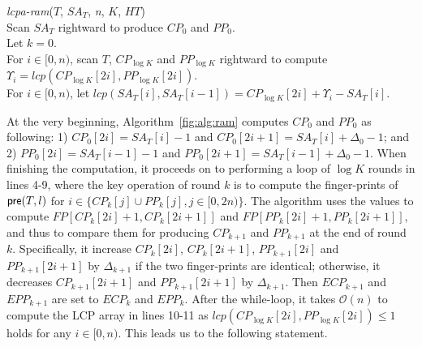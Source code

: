 \documentclass{llncs}
\begin{document}
\begin{algorithm}[hbtp!]
\caption{Compute $K$-Order $LCPA_T$ in RAM}
\label{fig:alg:ram}
{\em lcpa-ram}($T$, $SA_T$, {\em n}, $K$, $HT$){\\
\SetAlgoNoLine
Scan $SA_T$ rightward to produce $CP_0$ and $PP_0$. \\
Let $k = 0$. \\
\While{$k < \log K$}{
\Indentp{-1em}
Radix-sort $CP_k$ and $PP_k$ to produce $ICP_k$ and $IPP_k$. \\
For $i\in [0,n)$, scan $T$ rightward to compute the finger-print of ${\sf pre}(T,i)$ and let $FP[0,i]=HT[i]$ if $i\in \{ICP_k[j] \cup IPP_k[j], j\in[0,2n)\}$. \\
For $i\in [0,n)$, scan $CP_k$ and $PP_k$ rightward to compute and compare $FP[CP_k[2i]+1,CP_k[2i+1]]$ and $FP[PP_k[2i]+1,PP_k[2i+1]]$ for generating $CP_{k+1}$ and $PP_{k+1}$. \\
Let $k = k +1$ and clear $HT$. \\
}
For $i\in [0,n)$, scan $T$, $CP_{\log K}$ and $PP_{\log K}$ rightward to compute $\Upsilon_i = lcp(CP_{\log K}[2i],PP_{\log K}[2i])$. \\
For $i\in [0,n)$, let $lcp(SA_T[i],SA_T[i-1])=CP_{\log K}[2i] +\Upsilon_i-SA_T[i]$. \\
}
\end{algorithm}

At the very beginning, Algorithm~\ref{fig:alg:ram} computes $CP_0$ and $PP_0$ as following: 1) $CP_0[2i]=SA_T[i]-1$ and $CP_0[2i+1]=SA_T[i]+ \Delta_0 - 1$; and 2) $PP_0[2i]=SA_T[i-1]-1$ and $PP_0[2i+1]=SA_T[i-1]+ \Delta_0 - 1$. When finishing the computation, it proceeds on to performing a loop of $\log K$ rounds in lines 4-9, where the key operation of round $k$ is to compute the finger-prints of ${\sf pre}(T,l)$ for $i\in \{CP_k[j] \cup PP_k[j], j\in[0,2n)\}$.  The algorithm uses the values to compute $FP[CP_k[2i]+1,CP_k[2i+1]]$ and $FP[PP_k[2i]+1,PP_k[2i+1]]$, and thus to compare them for producing $CP_{k+1}$ and $PP_{k+1}$ at the end of round $k$. Specifically, it increase $CP_{k}[2i]$, $CP_{k}[2i+1]$, $PP_{k+1}[2i]$ and $PP_{k+1}[2i+1]$  by $\Delta_{k+1}$ if the two finger-prints are identical; otherwise, it decreases $CP_{k+1}[2i+1]$ and $PP_{k+1}[2i+1]$ by $\Delta_{k+1}$. Then $ECP_{k+1}$ and $EPP_{k+1}$ are set to $ECP_k$ and $EPP_k$. After the while-loop, it takes $\mathcal{O}(n)$ to compute the {LCP} array in lines 10-11 as $lcp(CP_{\log K}[2i],PP_{\log K}[2i]) \le 1$ holds for any $i \in [0,n)$. This leads us to the following statement.
\end{document}
